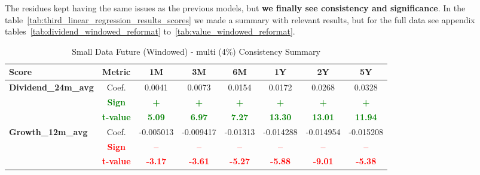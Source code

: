 \documentclass[11pt,english,a4paper,hidelinks]{book}
\begin{document}
\noindent The residues kept having the same issues as the previous models, but \textbf{we finally see consistency and significance}. In the table~\ref{tab:third_linear_regression_results_scores} we made a summary with relevant results, but for the full data see appendix tables~\ref{tab:dividend_windowed_reformat} to~\ref{tab:value_windowed_reformat}.
\begin{table}[H]
    \centering
    \caption{Small Data Future (Windowed) - \acrshort{multi} (4\%) Consistency Summary}
    \begin{tabular}{lccccccc}
        \toprule
        \textbf{Score} & \textbf{Metric} & \textbf{1M} & \textbf{3M} & \textbf{6M} & \textbf{1Y} & \textbf{2Y} & \textbf{5Y} \\
        \midrule
        \multirow{3}{*}{\textbf{Dividend\_24m\_avg}} 
        & Coef.   & 0.0041   & 0.0073  & 0.0154  & 0.0172  & 0.0268  & 0.0328  \\
        & \textbf{\textcolor{green}{Sign}}
                     & \textbf{\textcolor{green}{+}}
                     & \textbf{\textcolor{green}{+}}
                     & \textbf{\textcolor{green}{+}}
                     & \textbf{\textcolor{green}{+}}
                     & \textbf{\textcolor{green}{+}}
                     & \textbf{\textcolor{green}{+}} \\
        & \textbf{\textcolor{green}{t-value}}
                     & \textbf{\textcolor{green}{5.09}}
                     & \textbf{\textcolor{green}{6.97}}
                     & \textbf{\textcolor{green}{7.27}}
                     & \textbf{\textcolor{green}{13.30}}
                     & \textbf{\textcolor{green}{13.01}}
                     & \textbf{\textcolor{green}{11.94}} \\
        \midrule
        \multirow{3}{*}{\textbf{Growth\_12m\_avg}}
            & Coef.   & -0.005013 & -0.009417 & -0.01313  & -0.014288 & -0.014954 & -0.015208 \\
            & \textbf{\textcolor{red}{Sign}}    & \textbf{\textcolor{red}{–}}         & \textbf{\textcolor{red}{–}}         & \textbf{\textcolor{red}{–}}         & \textbf{\textcolor{red}{–}}         & \textbf{\textcolor{red}{–}}         & \textbf{\textcolor{red}{–}}         \\
            & \textbf{\textcolor{red}{t-value}} & \textbf{\textcolor{red}{-3.17}}     & \textbf{\textcolor{red}{-3.61}}     & \textbf{\textcolor{red}{-5.27}}     & \textbf{\textcolor{red}{-5.88}}     & \textbf{\textcolor{red}{-9.01}}     & \textbf{\textcolor{red}{-5.38}}     \\

\end{tabular}
\end{table}
\end{document}
